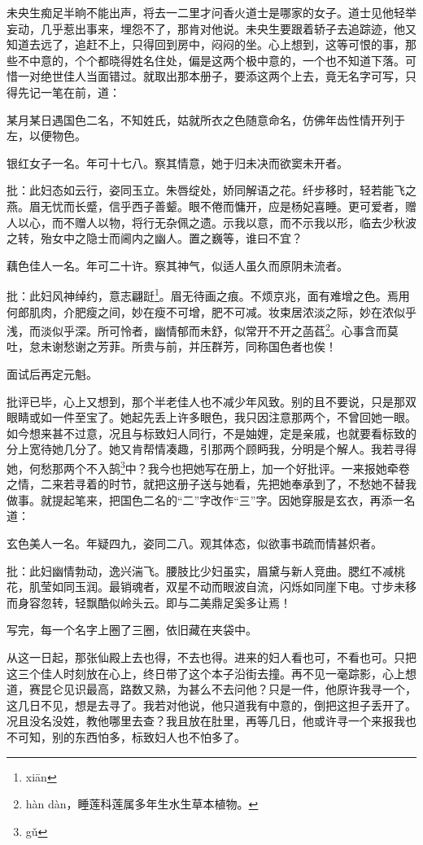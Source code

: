 \documentclass[a4paper,12pt,UTF8,twoside]{ctexbook}
\begin{document}
未央生痴足半晌不能出声，将去一二里才问香火道士是哪家的女子。道士见他轻举妄动，几乎惹出事来，埋怨不了，那肯对他说。未央生要跟着轿子去追踪迹，他又知道去远了，追赶不上，只得回到房中，闷闷的坐。心上想到，这等可恨的事，那些不中意的，个个都晓得姓名住处，偏是这两个极中意的，一个也不知道下落。可惜一对绝世佳人当面错过。就取出那本册子，要添这两个上去，竟无名字可写，只得先记一笔在前，道：

某月某日遇国色二名，不知姓氏，姑就所衣之色随意命名，仿佛年齿性情开列于左，以便物色。

银红女子一名。年可十七八。察其情意，她于归未决而欲窦未开者。

批：此妇态如云行，姿同玉立。朱唇绽处，娇同解语之花。纤步移时，轻若能飞之燕。眉无忧而长蹙，信乎西子善颦。眼不倦而慵开，应是杨妃喜睡。更可爱者，赠人以心，而不赠人以物，将行无杂佩之遗。示我以意，而不示我以形，临去少秋波之转，殆女中之隐士而阃内之幽人。置之巍等，谁曰不宜？

藕色佳人一名。年可二十许。察其神气，似适人虽久而原阴未流者。

批：此妇风神绰约，意志翩跹\footnote{xi\=an}。眉无待画之痕。不烦京兆，面有难增之色。焉用何郎肌肉，介肥瘦之间，妙在瘦不可增，肥不可减。妆束居浓淡之际，妙在浓似乎浅，而淡似乎深。所可怜者，幽情郁而未舒，似常开不开之菡萏\footnote{h\`an d\`an，睡莲科莲属多年生水生草本植物。}。心事含而莫吐，怠未谢愁谢之芳菲。所贵与前，并压群芳，同称国色者也俟！

面试后再定元魁。

批评已毕，心上又想到，那个半老佳人也不减少年风致。别的且不要说，只是那双眼睛或如一件至宝了。她起先丢上许多眼色，我只因注意那两个，不曾回她一眼。如今想来甚不过意，况且与标致妇人同行，不是妯娌，定是亲戚，也就要看标致的分上宽待她几分了。她又肯帮情凑趣，引那两个顾眄我，分明是个解人。我若寻得她，何愁那两个不入鹄\footnote{g\v{u}}中？我今也把她写在册上，加一个好批评。一来报她牵卷之情，二来若寻着的时节，就把这册子送与她看，先把她奉承到了，不愁她不替我做事。就提起笔来，把国色二名的“二”字改作“三”字。因她穿服是玄衣，再添一名道：

玄色美人一名。年疑四九，姿同二八。观其体态，似欲事书疏而情甚炽者。

批：此妇幽情勃动，逸兴湍飞。腰肢比少妇虽实，眉黛与新人竞曲。腮红不减桃花，肌莹如同玉润。最销魂者，双星不动而眼波自流，闪烁如同崖下电。寸步未移而身容忽转，轻飘酷似岭头云。即与二美鼎足奚多让焉！

写完，每一个名字上圈了三圈，依旧藏在夹袋中。

从这一日起，那张仙殿上去也得，不去也得。进来的妇人看也可，不看也可。只把这三个佳人时刻放在心上，终日带了这个本子沿街去撞。再不见一毫踪影，心上想道，赛昆仑见识最高，路数又熟，为甚么不去问他？只是一件，他原许我寻一个，这几日不见，想是去寻了。我若对他说，他只道我有中意的，倒把这担子丢开了。况且没名没姓，教他哪里去查？我且放在肚里，再等几日，他或许寻一个来报我也不可知，别的东西怕多，标致妇人也不怕多了。
\end{document}
